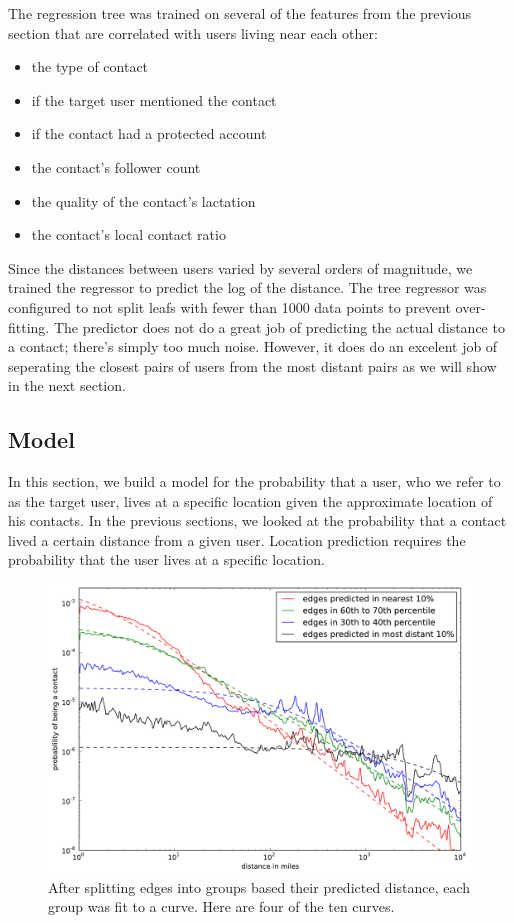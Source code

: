 The regression tree was trained on several of the features from the previous
section that are correlated with users living near each other:
\begin{itemize}
\item the type of contact
\item if the target user mentioned the contact
\item if the contact had a protected account
\item the contact's follower count
\item the quality of the contact's lactation
\item the contact's local contact ratio
\end{itemize}
%
Since the distances between users varied by several orders of magnitude, we
trained the regressor to predict the log of the distance.
%
The tree regressor was configured to not split leafs with fewer than 1000 data
points to prevent over-fitting.
%
The predictor does not do a great job of predicting the actual distance to a
contact; there's simply too much noise.
%
However, it does do an excelent job of seperating the closest pairs of users
from the most distant pairs as we will show in the next section.


\subsection{Model}
\label{sec:model}

In this section, we build a model for the probability that a user, who we refer
to as the target user, lives at a specific location given the approximate
location of his contacts.
%
In the previous sections, we looked at the probability that a contact lived a
certain distance from a given user.
%
Location prediction requires the probability that the user lives at a specific
location.


\begin{figure}[tb]
\centering
\includegraphics[width=\linewidth]{figures/near_prob_fit.pdf}
\caption{
After splitting edges into groups based their predicted distance, each group was fit to a curve. Here are four of the ten curves.
}
\label{fig:NearProbFit}
\end{figure}

